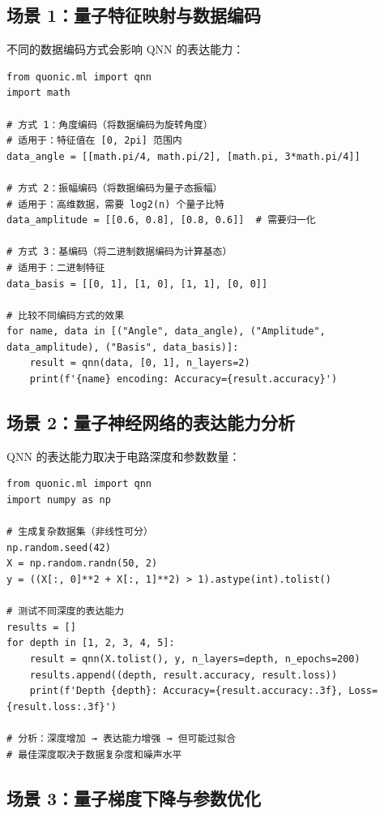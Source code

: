\documentclass[12pt,a4paper]{article}
\begin{document}
\subsection{场景 1：量子特征映射与数据编码}

不同的数据编码方式会影响 QNN 的表达能力：

\begin{verbatim}
from quonic.ml import qnn
import math

# 方式 1：角度编码（将数据编码为旋转角度）
# 适用于：特征值在 [0, 2pi] 范围内
data_angle = [[math.pi/4, math.pi/2], [math.pi, 3*math.pi/4]]

# 方式 2：振幅编码（将数据编码为量子态振幅）
# 适用于：高维数据，需要 log2(n) 个量子比特
data_amplitude = [[0.6, 0.8], [0.8, 0.6]]  # 需要归一化

# 方式 3：基编码（将二进制数据编码为计算基态）
# 适用于：二进制特征
data_basis = [[0, 1], [1, 0], [1, 1], [0, 0]]

# 比较不同编码方式的效果
for name, data in [("Angle", data_angle), ("Amplitude", data_amplitude), ("Basis", data_basis)]:
    result = qnn(data, [0, 1], n_layers=2)
    print(f'{name} encoding: Accuracy={result.accuracy}')
\end{verbatim}

\subsection{场景 2：量子神经网络的表达能力分析}

QNN 的表达能力取决于电路深度和参数数量：

\begin{verbatim}
from quonic.ml import qnn
import numpy as np

# 生成复杂数据集（非线性可分）
np.random.seed(42)
X = np.random.randn(50, 2)
y = ((X[:, 0]**2 + X[:, 1]**2) > 1).astype(int).tolist()

# 测试不同深度的表达能力
results = []
for depth in [1, 2, 3, 4, 5]:
    result = qnn(X.tolist(), y, n_layers=depth, n_epochs=200)
    results.append((depth, result.accuracy, result.loss))
    print(f'Depth {depth}: Accuracy={result.accuracy:.3f}, Loss={result.loss:.3f}')

# 分析：深度增加 → 表达能力增强 → 但可能过拟合
# 最佳深度取决于数据复杂度和噪声水平
\end{verbatim}

\subsection{场景 3：量子梯度下降与参数优化}
\end{document}
